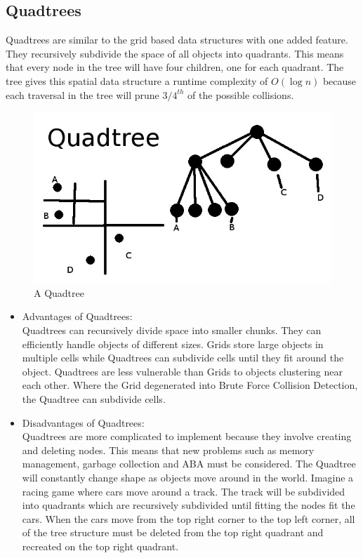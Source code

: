 \documentclass[conference]{IEEEtran}
\begin{document}
	\subsection{Quadtrees}
	Quadtrees are similar to the grid based data structures with one added feature. They recursively subdivide the space of all objects into quadrants. This means that every node in the tree will have four children, one for each quadrant. The tree gives this spatial data structure a runtime complexity of $O(\log{n})$ because each traversal in the tree will prune $3/4^{th}$ of the possible collisions.\\

\begin{figure}[!h]
\centering
\includegraphics[scale=0.38]{quadtree}
\caption{A Quadtree}
\label{fig_sim}
\end{figure}
	
\begin{itemize}
  \item Advantages of Quadtrees:\\
  Quadtrees can recursively divide space into smaller chunks. They can efficiently handle objects of different sizes. Grids store large objects in multiple cells while Quadtrees can subdivide cells until they fit around the object. Quadtrees are less vulnerable than Grids to objects clustering near each other. Where the Grid degenerated into Brute Force Collision Detection, the Quadtree can subdivide cells.\\
  \item Disadvantages of Quadtrees:\\
  Quadtrees are more complicated to implement because they involve creating and deleting nodes. This means that new problems such as memory management, garbage collection and ABA must be considered. The Quadtree will constantly change shape as objects move around in the world. Imagine a racing game where cars move around a track. The track will be subdivided into quadrants which are recursively subdivided until fitting the nodes fit the cars. When the cars move from the top right corner to the top left corner, all of the tree structure must be deleted from the top right quadrant and recreated on the top right quadrant.\\
\end{itemize}
\end{document}
